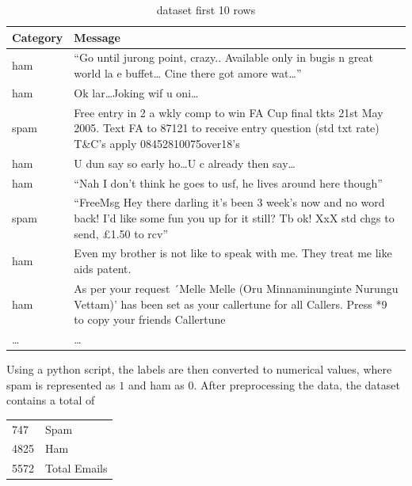 \documentclass[12pt,a4paper]{article}
\begin{document}
\begin{longtable}[!ht]{p{2cm}|p{11cm}}
    \caption{ dataset first 10 rows}                                               \\
    \label{tab:maildata} %
    \textbf{Category} & \textbf{Message}                                                                \\
    \hline %
    ham      & ``Go until jurong point, crazy.. Available only in bugis n great world la e buffet\dots
               Cine there got amore wat\dots''                                                          \\
    \hline %
    ham      & Ok lar\dots Joking wif u oni\dots                                                        \\
    \hline %
    spam     & Free entry in 2 a wkly comp to win FA Cup final tkts 21st May 2005. Text FA to 87121 to
               receive entry question (std txt rate) T\&C's apply 08452810075over18's                   \\
    \hline %
    ham      & U dun say so early ho\dots U c already then say\dots                                     \\
    \hline %
    ham      & ``Nah I don't think he goes to usf, he lives around here though''                        \\
    \hline %
    spam     & ``FreeMsg Hey there darling it's been 3 week's now and no word back! I'd like some fun you
                up for it still? Tb ok! XxX std chgs to send, \pounds1.50 to rcv''                      \\
    \hline %
    ham      & Even my brother is not like to speak with me. They treat me like aids patent.            \\
    \hline %
    ham      & As per your request ´Melle Melle (Oru Minnaminunginte Nurungu Vettam)' has
               been set as your callertune for all Callers. Press *9 to copy your friends Callertune    \\
    \hline %
    \dots    & \dots                                                                                    \\
\end{longtable}

Using a python script, the labels are then converted to numerical values, where spam is represented as $1$
and ham as $0$. After preprocessing the data, the dataset contains a total of 
\begin{longtable}[!ht]{p{3cm}p{10cm}}
    747  & Spam         \\
    4825 & Ham          \\
    5572 & Total Emails \\
\end{longtable}
\end{document}
